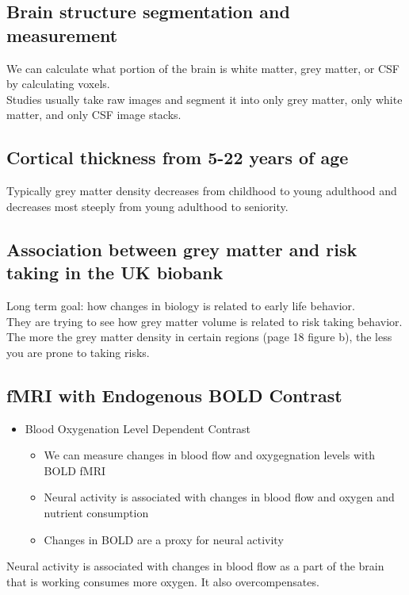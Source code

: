 \subsection{Brain structure segmentation and measurement}
We can calculate what portion of the brain is white matter, grey matter, or CSF by calculating voxels.
\\Studies usually take raw images and segment it into only grey matter, only white matter, and only CSF image stacks.

\subsection{Cortical thickness from 5-22 years of age}
Typically grey matter density decreases from childhood to young adulthood and decreases most steeply from young adulthood to seniority.
\subsection{Association between grey matter and risk taking in the UK biobank}
Long term goal: how changes in biology is related to early life behavior. 
\\They are trying to see how grey matter volume is related to risk taking behavior. The more the grey matter density in certain regions (page 18 figure b), the less you are prone to taking risks.

\subsection{fMRI with Endogenous BOLD Contrast}
\begin{itemize}
    \item Blood Oxygenation Level Dependent Contrast
    \begin{itemize}
        \item We can measure changes in blood flow and oxygegnation levels with BOLD fMRI 
        \item Neural activity is associated with changes in blood flow and oxygen and nutrient consumption
        \item Changes in BOLD are a proxy for neural activity
    \end{itemize}
\end{itemize}
Neural activity is associated with changes in blood flow as a part of the brain that is working consumes more oxygen. It also overcompensates.
